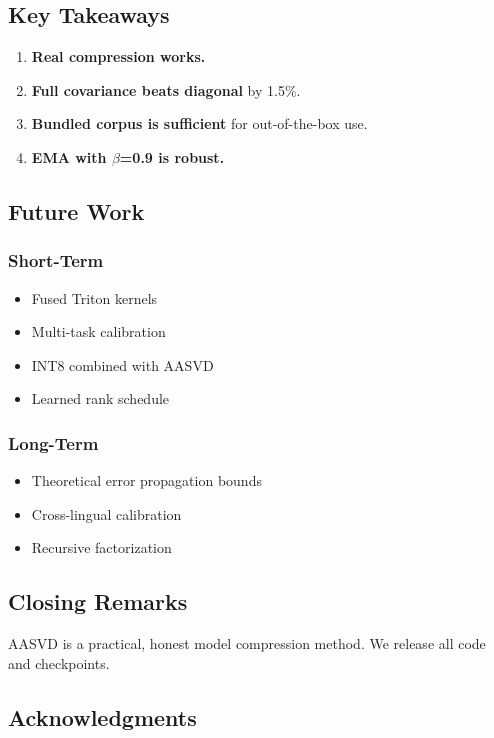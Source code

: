 \subsection{Key Takeaways}

\begin{enumerate}
\item \textbf{Real compression works.}
\item \textbf{Full covariance beats diagonal} by 1.5\%.
\item \textbf{Bundled corpus is sufficient} for out-of-the-box use.
\item \textbf{EMA with $\beta$=0.9 is robust.}

\end{enumerate}
\subsection{Future Work}

\subsubsection{Short-Term}
\begin{itemize}
\item Fused Triton kernels
\item Multi-task calibration
\item INT8 combined with AASVD
\item Learned rank schedule

\end{itemize}
\subsubsection{Long-Term}
\begin{itemize}
\item Theoretical error propagation bounds
\item Cross-lingual calibration
\item Recursive factorization

\end{itemize}
\subsection{Closing Remarks}

AASVD is a practical, honest model compression method. We release all code 
and checkpoints.

\subsection{Acknowledgments}

